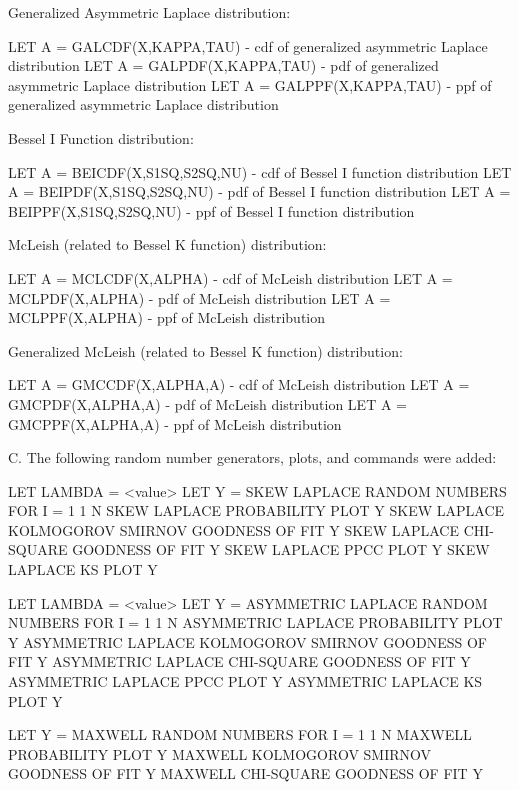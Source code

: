 {       Generalized Asymmetric Laplace distribution:

       LET A = GALCDF(X,KAPPA,TAU) - cdf of generalized asymmetric
                                     Laplace distribution
       LET A = GALPDF(X,KAPPA,TAU) - pdf of generalized asymmetric
                                     Laplace distribution
       LET A = GALPPF(X,KAPPA,TAU) - ppf of generalized asymmetric
                                     Laplace distribution

       Bessel I Function distribution:

       LET A = BEICDF(X,S1SQ,S2SQ,NU) - cdf of Bessel I function
                                        distribution
       LET A = BEIPDF(X,S1SQ,S2SQ,NU) - pdf of Bessel I function
                                        distribution
       LET A = BEIPPF(X,S1SQ,S2SQ,NU) - ppf of Bessel I function
                                        distribution

       McLeish (related to Bessel K function) distribution:

       LET A = MCLCDF(X,ALPHA) - cdf of McLeish distribution
       LET A = MCLPDF(X,ALPHA) - pdf of McLeish distribution
       LET A = MCLPPF(X,ALPHA) - ppf of McLeish distribution

       Generalized McLeish (related to Bessel K function) distribution:

       LET A = GMCCDF(X,ALPHA,A) - cdf of McLeish distribution
       LET A = GMCPDF(X,ALPHA,A) - pdf of McLeish distribution
       LET A = GMCPPF(X,ALPHA,A) - ppf of McLeish distribution

    C. The following random number generators, plots, and commands
       were added:

         LET LAMBDA = <value>
         LET Y = SKEW LAPLACE RANDOM NUMBERS FOR I = 1 1 N
         SKEW LAPLACE PROBABILITY PLOT Y
         SKEW LAPLACE KOLMOGOROV SMIRNOV GOODNESS OF FIT Y
         SKEW LAPLACE CHI-SQUARE GOODNESS OF FIT Y
         SKEW LAPLACE PPCC PLOT Y
         SKEW LAPLACE KS PLOT Y

         LET LAMBDA = <value>
         LET Y = ASYMMETRIC LAPLACE RANDOM NUMBERS FOR I = 1 1 N
         ASYMMETRIC LAPLACE PROBABILITY PLOT Y
         ASYMMETRIC LAPLACE KOLMOGOROV SMIRNOV GOODNESS OF FIT Y
         ASYMMETRIC LAPLACE CHI-SQUARE GOODNESS OF FIT Y
         ASYMMETRIC LAPLACE PPCC PLOT Y
         ASYMMETRIC LAPLACE KS PLOT Y

         LET Y = MAXWELL RANDOM NUMBERS FOR I = 1 1 N
         MAXWELL PROBABILITY PLOT Y
         MAXWELL KOLMOGOROV SMIRNOV GOODNESS OF FIT Y
         MAXWELL CHI-SQUARE GOODNESS OF FIT Y

}
